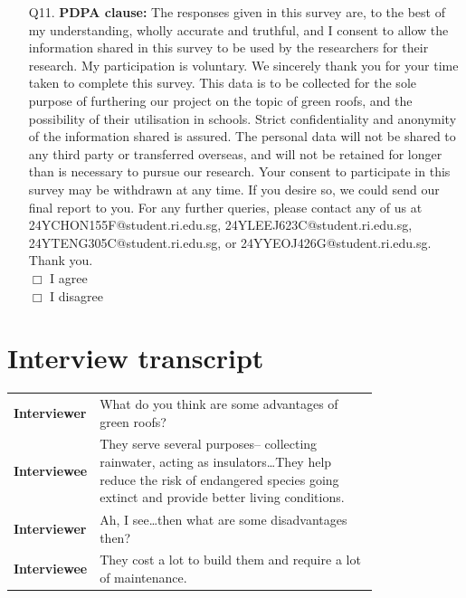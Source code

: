 \documentclass[a4paper]{article}
\begin{document}
\begin{appendices}
\begin{itemize}
    \item[Q11.] \textbf{PDPA clause:} The responses given in this survey
      are, to the best of my understanding, wholly accurate and truthful,
      and I consent to allow the information shared in this survey to
      be used by the researchers for their research. My participation
      is voluntary. We sincerely thank you for your time taken to
      complete this survey. This data is to be collected for the sole
      purpose of furthering our project on the topic of green roofs,
      and the possibility of their utilisation in schools. Strict
      confidentiality and anonymity of the information shared is
      assured. The personal data will not be shared to any third party
      or transferred overseas, and will not be retained for longer than
      is necessary to pursue our research. Your consent to participate
      in this survey may be withdrawn at any time. If you desire so,
      we could send our final report to you. For any further queries,
      please contact any of us at 24YCHON155F@student.ri.edu.sg,
      24YLEEJ623C@student.ri.edu.sg, 24YTENG305C@student.ri.edu.sg,
      or 24YYEOJ426G@student.ri.edu.sg. Thank you. \\ $\Box$ I agree \\
      $\Box$ I disagree
  \end{itemize}

  \section{Interview transcript}
  \begin{table}[H]
    \begin{tabular}{l @{:    } p{0.8\linewidth}}
      \hline
      \textbf{Interviewer} & What do you think are some advantages of
      green roofs? \\

      \textbf{Interviewee} & They serve several purposes-- collecting
      rainwater, acting as insulators\ldots They help reduce the risk
      of endangered species going extinct and provide better living
      conditions. \\

      \textbf{Interviewer} & Ah, I see\ldots then what are some
      disadvantages then? \\

      \textbf{Interviewee} & They cost a lot to build them and require a
      lot of maintenance. \\


\end{tabular}
\end{table}
\end{appendices}
\end{document}
